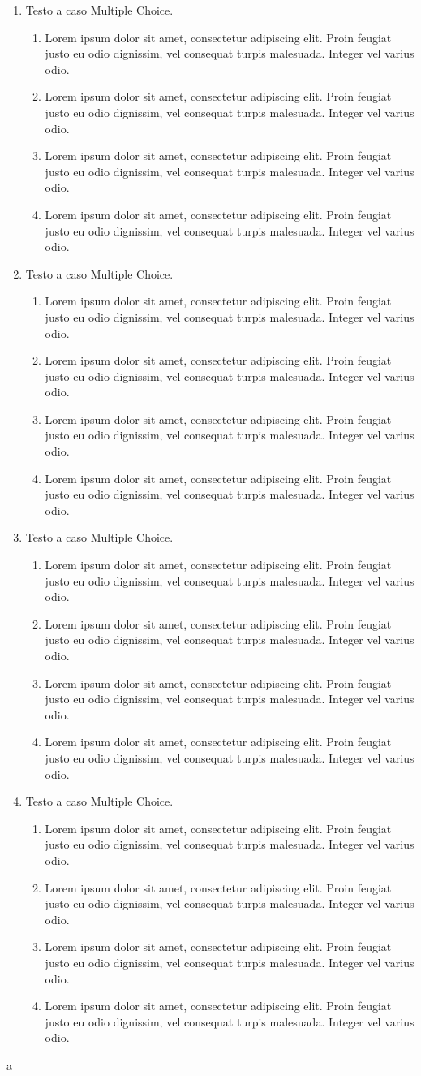 \documentclass{book}
\newcommand{\lorem}{Lorem ipsum dolor sit amet, consectetur adipiscing elit. Proin feugiat justo eu odio dignissim, vel consequat turpis malesuada. Integer vel varius odio.}
\begin{document}
\begin{enumerate}
\begin{enumerate}[label=\Alph*]
    \item \lorem
    \item \lorem
    \item \lorem
    \item \lorem
\end{enumerate}
\item Testo a caso Multiple Choice.\\
\begin{enumerate}[label=\Alph*]
    \item \lorem
    \item \lorem
    \item \lorem
    \item \lorem
\end{enumerate}
\item Testo a caso Multiple Choice.\\
\begin{enumerate}[label=\Alph*]
    \item \lorem
    \item \lorem
    \item \lorem
    \item \lorem
\end{enumerate}
\item Testo a caso Multiple Choice.\\
\begin{enumerate}[label=\Alph*]
    \item \lorem
    \item \lorem
    \item \lorem
    \item \lorem
\end{enumerate}
\item Testo a caso Multiple Choice.\\
\begin{enumerate}[label=\Alph*]
    \item \lorem
    \item \lorem
    \item \lorem
    \item \lorem
\end{enumerate}
\end{enumerate}a
\end{document}
